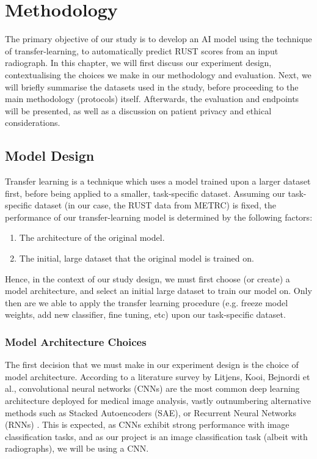 
\chapter{Methodology}

The primary objective of our study is to develop an AI model using the technique of transfer-learning, to automatically predict RUST scores from an input radiograph. In this chapter, we will first discuss our experiment design, contextualising the choices we make in our methodology and evaluation. Next, we will briefly summarise the datasets used in the study, before proceeding to the main methodology (protocols) itself. Afterwards, the evaluation and endpoints will be presented, as well as a discussion on patient privacy and ethical considerations.

\section{Model Design}

Transfer learning is a technique which uses a model trained upon a larger dataset first, before being applied to a smaller, task-specific dataset. Assuming our task-specific dataset (in our case, the RUST data from METRC) is fixed, the performance of our transfer-learning model is determined by the following factors:

\begin{enumerate}
    \item The architecture of the original model.
    \item The initial, large dataset that the original model is trained on.
\end{enumerate}

\noindent
Hence, in the context of our study design, we must first choose (or create) a model architecture, and select an initial large dataset to train our model on. Only then are we able to apply the transfer learning procedure (e.g. freeze model weights, add new classifier, fine tuning, etc) upon our task-specific dataset.

\subsection{Model Architecture Choices}

The first decision that we must make in our experiment design is the choice of model architecture.
According to a literature survey by Litjens, Kooi, Bejnordi et al., convolutional neural networks (CNNs) are the most common deep learning architecture deployed for medical image analysis, vastly outnumbering alternative methods such as Stacked Autoencoders (SAE), or Recurrent Neural Networks (RNNs) \autocite[77]{cnn-most-common}.
This is expected, as CNNs exhibit strong performance with image classification tasks, and as our project is an image classification task (albeit with radiographs), we will be using a CNN.

